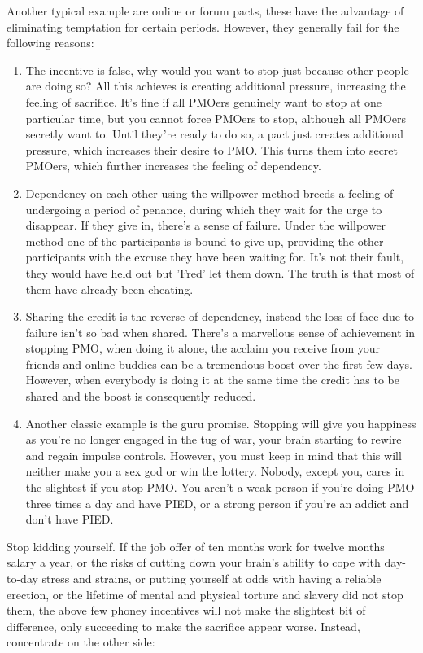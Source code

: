 \documentclass[easypeasy.tex]{subfiles}
\begin{document}
Another typical example are online or forum pacts, these have the advantage of eliminating temptation for certain periods. However, they generally fail for the following reasons:
\begin{enumerate}
  \item The incentive is false, why would you want to stop just because other people are doing so? All this achieves is creating additional pressure, increasing the feeling of sacrifice. It's fine if all PMOers genuinely want to stop at one particular time, but you cannot force PMOers to stop, although all PMOers secretly want to. Until they're ready to do so, a pact just creates additional pressure, which increases their desire to PMO. This turns them into secret PMOers, which further increases the feeling of dependency.

  \item Dependency on each other using the willpower method breeds a feeling of undergoing a period of penance, during which they wait for the urge to disappear. If they give in, there's a sense of failure. Under the willpower method one of the participants is bound to give up, providing the other participants with the excuse they have been waiting for. It's not their fault, they would have held out but 'Fred' let them down. The truth is that most of them have already been cheating.

  \item Sharing the credit is the reverse of dependency, instead the loss of face due to failure isn't so bad when shared. There's a marvellous sense of achievement in stopping PMO, when doing it alone, the acclaim you receive from your friends and online buddies can be a tremendous boost over the first few days. However, when everybody is doing it at the same time the credit has to be shared and the boost is consequently reduced.

  \item Another classic example is the guru promise. Stopping will give you happiness as you're no longer engaged in the tug of war, your brain starting to rewire and regain impulse controls. However, you must keep in mind that this will neither make you a sex god or win the lottery. Nobody, except you, cares in the slightest if you stop PMO. You aren't a weak person if you're doing PMO three times a day and have PIED, or a strong person if you're an addict and don't have PIED.
\end{enumerate}
Stop kidding yourself. If the job offer of ten months work for twelve months salary a year, or the risks of cutting down your brain's ability to cope with day-to-day stress and strains, or putting yourself at odds with having a reliable erection, or the lifetime of mental and physical torture and slavery did not stop them, the above few phoney incentives will not make the slightest bit of difference, only succeeding to make the sacrifice appear worse. Instead, concentrate on the other side:
  
\end{document}
